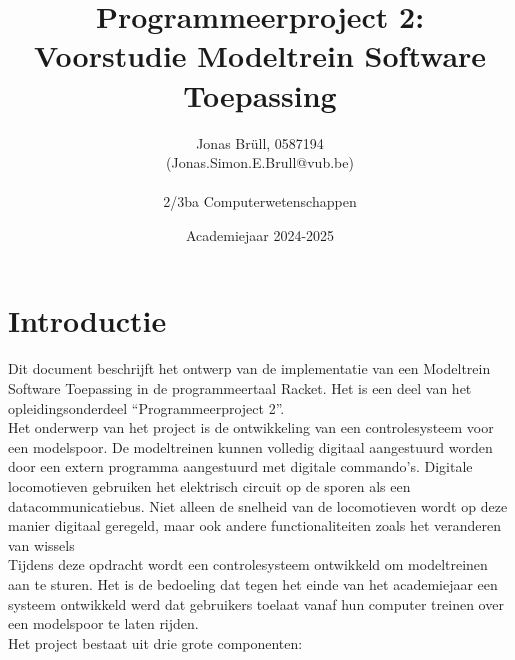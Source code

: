 \documentclass[a4paper, 11pt]{article}
\title{Programmeerproject 2:\\ Voorstudie Modeltrein Software Toepassing}
\date{Academiejaar 2024-2025}
\author{Jonas Br\"ull, 0587194\\ (Jonas.Simon.E.Brull@vub.be)\\\\ 2/3ba Computerwetenschappen}
\newcommand{\<}{\scriptsize\textless\normalsize}
\renewcommand{\>}{\scriptsize\textgreater\normalsize}
\begin{document}
\maketitle
\newpage

\tableofcontents
\newpage

\pagestyle{fancy}
\setcounter{page}{1}

\section{Introductie} %
Dit document beschrijft het ontwerp van de implementatie van een Modeltrein Software Toepassing in de programmeertaal Racket. Het is een deel van het opleidingsonderdeel ``Programmeerproject 2''.\\
\newline
Het onderwerp van het project is de ontwikkeling van een controlesysteem voor een modelspoor. De modeltreinen kunnen volledig digitaal aangestuurd worden door een extern programma aangestuurd met digitale commando’s. Digitale locomotieven gebruiken het elektrisch circuit op de sporen als een datacommunicatiebus. Niet alleen de snelheid van de locomotieven wordt op deze manier digitaal
geregeld, maar ook andere functionaliteiten zoals het veranderen van wissels\\
\newline
Tijdens deze opdracht wordt een controlesysteem ontwikkeld om modeltreinen aan te sturen. Het is de
bedoeling dat tegen het einde van het academiejaar een systeem ontwikkeld werd dat gebruikers
toelaat vanaf hun computer treinen over een modelspoor te laten rijden.\\
\newline
Het project bestaat uit drie grote componenten:
\end{document}

